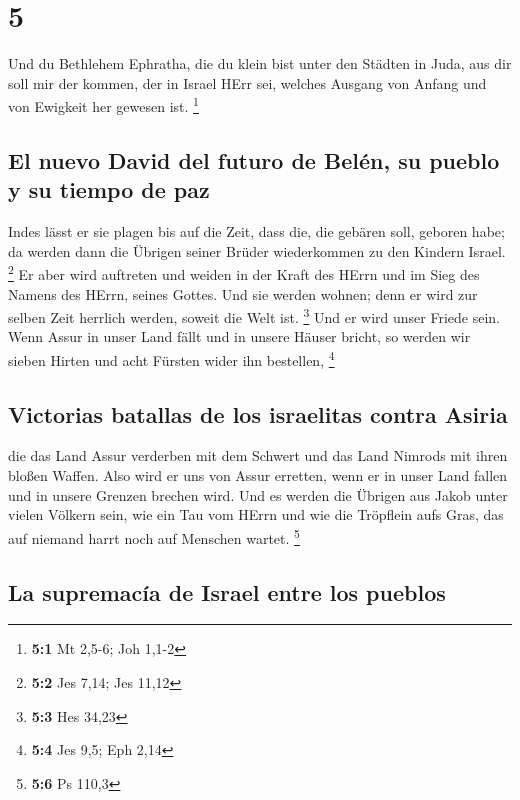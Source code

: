\hypertarget{section-4}{%
\section{5}\label{section-4}}

 Und du Bethlehem Ephratha, die du klein bist unter den
Städten in Juda, aus dir soll mir der kommen, der in Israel HErr sei,
welches Ausgang von Anfang und von Ewigkeit her gewesen ist. \footnote{\textbf{5:1}
  Mt 2,5-6; Joh 1,1-2}

\hypertarget{el-nuevo-david-del-futuro-de-beluxe9n-su-pueblo-y-su-tiempo-de-paz}{%
\subsection{El nuevo David del futuro de Belén, su pueblo y su tiempo de
paz}\label{el-nuevo-david-del-futuro-de-beluxe9n-su-pueblo-y-su-tiempo-de-paz}}

 Indes lässt er sie plagen bis auf die Zeit, dass die, die
gebären soll, geboren habe; da werden dann die Übrigen seiner Brüder
wiederkommen zu den Kindern Israel. \footnote{\textbf{5:2} Jes 7,14; Jes
  11,12}  Er aber wird auftreten und weiden in der Kraft
des HErrn und im Sieg des Namens des HErrn, seines Gottes. Und sie
werden wohnen; denn er wird zur selben Zeit herrlich werden, soweit die
Welt ist. \footnote{\textbf{5:3} Hes 34,23}  Und er wird
unser Friede sein. Wenn Assur in unser Land fällt und in unsere Häuser
bricht, so werden wir sieben Hirten und acht Fürsten wider ihn
bestellen, \footnote{\textbf{5:4} Jes 9,5; Eph 2,14}

\hypertarget{victorias-batallas-de-los-israelitas-contra-asiria}{%
\subsection{Victorias batallas de los israelitas contra
Asiria}\label{victorias-batallas-de-los-israelitas-contra-asiria}}

 die das Land Assur verderben mit dem Schwert und das Land
Nimrods mit ihren bloßen Waffen. Also wird er uns von Assur erretten,
wenn er in unser Land fallen und in unsere Grenzen brechen wird.
 Und es werden die Übrigen aus Jakob unter vielen Völkern
sein, wie ein Tau vom HErrn und wie die Tröpflein aufs Gras, das auf
niemand harrt noch auf Menschen wartet. \footnote{\textbf{5:6} Ps 110,3}

\hypertarget{la-supremacuxeda-de-israel-entre-los-pueblos}{%
\subsection{La supremacía de Israel entre los
pueblos}\label{la-supremacuxeda-de-israel-entre-los-pueblos}}

